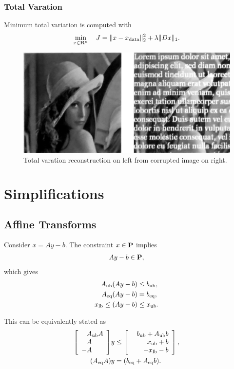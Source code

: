 \documentclass{article}
\begin{document}
\subsubsection{Total Varation}
Minimum total variation is computed with
\begin{align*}
    \min_{x\in\textbf{R}^n}\quad J = \|x-x_{\text{data}}\|_2^2+\lambda \|Dx\|_1.
\end{align*}
\begin{figure}[h!]
    \centering
    \includegraphics[width=.9\textwidth]{./figs/misc/tov.jpg}
    \caption{Total varation reconstruction on left from corrupted image on right.}
    \label{fig:tov}
\end{figure}

\clearpage

\section{Simplifications}

\subsection{Affine Transforms}

    Consider $x=Ay-b$.  The constraint $x\in\textbf{P}$ implies
    \begin{align*}
        Ay-b\in\textbf{P},
    \end{align*}
    which gives
    \begin{align*}
        A_{\text{ub}} (A&y-b)\leq b_{\text{ub}},\\
        A_{\text{eq}} (A&y-b) = b_{\text{eq}},\\
        x_{\text{lb}} \leq (A&y-b) \leq x_{\text{ub}}.
    \end{align*}

        This can be equivalently stated as
    \begin{align*}
        \left[\begin{array}{l}
            \minus A_\ub A
            \\
            \minus A
            \\
            -A
        \end{array}\right]
        &y\leq
        \left[\begin{array}{r}
            \minus b_\ub+A_\ub b
            \\
            \minus x_\ub +b
            \\
            -x_\lb-b
        \end{array}\right],\\
        (A_\eq A)&y = (b_\eq+A_\eq b).
    \end{align*}
\end{document}
